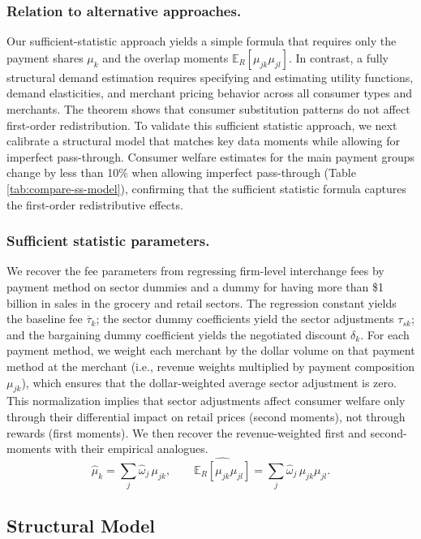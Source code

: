 \documentclass[main.tex]{subfiles}
\begin{document}
\subsubsection{Relation to alternative approaches.}
Our sufficient-statistic approach yields a simple formula that requires only the payment shares $\mu_k$ and the overlap moments $\mathbb{E}_R[\mu_{jk}\mu_{jl}]$.
In contrast, a fully structural demand estimation requires specifying and estimating utility functions, demand elasticities, and merchant pricing behavior across all consumer types and merchants.
The theorem shows that consumer substitution patterns do not affect first-order redistribution.
To validate this sufficient statistic approach, we next calibrate a structural model that matches key data moments while allowing for imperfect pass-through.
Consumer welfare estimates for the main payment groups change by less than 10\% when allowing imperfect pass-through (Table \ref{tab:compare-ss-model}), confirming that the sufficient statistic formula captures the first-order redistributive effects.

\subsubsection{Sufficient statistic parameters.}
We recover the fee parameters from regressing firm-level interchange fees by payment method on sector dummies and a dummy for having more than \$1 billion in sales in the grocery and retail sectors.
The regression constant yields the baseline fee $\overline{\tau}_k$; the sector dummy coefficients yield the sector adjustments $\tau_{sk}$; and the bargaining dummy coefficient yields the negotiated discount $\delta_k$.
For each payment method, we weight each merchant by the dollar volume on that payment method at the merchant (i.e., revenue weights multiplied by payment composition $\mu_{jk}$), which ensures that the dollar-weighted average sector adjustment is zero.
This normalization implies that sector adjustments affect consumer welfare only through their differential impact on retail prices (second moments), not through rewards (first moments). We then recover the revenue-weighted first and second-moments with their empirical analogues.
\[
\widehat{\mu}_k = \sum_j \widehat \omega_j\,\mu_{jk}, \qquad
\widehat{\mathbb{E}_R[\mu_{jk}\mu_{jl}]} = \sum_j \widehat \omega_j\,\mu_{jk}\mu_{jl}.
\]

\subsection{Structural Model}
\end{document}
